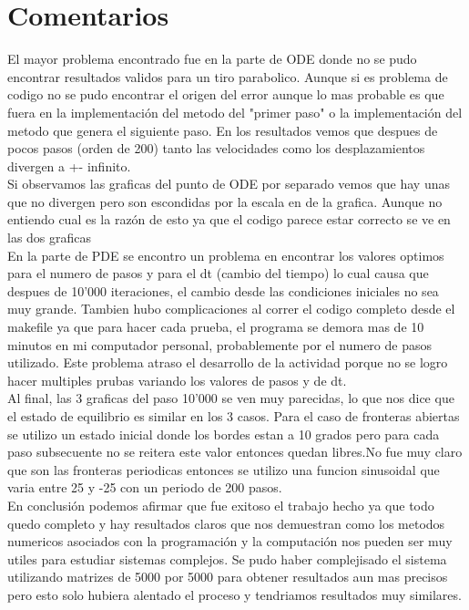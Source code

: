\documentclass[12pt]{article}
\begin{document}
\section{Comentarios}
El mayor problema encontrado fue en la parte de ODE donde no se pudo encontrar resultados validos para un tiro parabolico. Aunque si es problema de codigo no se pudo encontrar el origen del error aunque lo mas probable es que fuera en la implementaci\'on del metodo del "primer paso" o la implementaci\'on del metodo que genera el siguiente paso. En los resultados vemos que despues de pocos pasos (orden de 200) tanto las velocidades como los desplazamientos divergen a +- infinito. 
\\
Si observamos las graficas del punto de ODE por separado vemos que hay unas que no divergen pero son escondidas por la escala en de la grafica. Aunque no entiendo cual es la raz\'on de esto ya que el codigo parece estar correcto se ve en las dos graficas 
\\
En la parte de PDE se encontro un problema en encontrar los valores optimos para el numero de pasos y para el dt (cambio del tiempo) lo cual causa que despues de 10'000 iteraciones, el cambio desde las condiciones iniciales no sea muy grande. Tambien hubo complicaciones al correr el codigo completo desde el makefile ya que para hacer cada prueba, el programa se demora mas de 10 minutos en mi computador personal, probablemente por el numero de pasos utilizado. Este problema atraso el desarrollo de la actividad porque no se logro hacer multiples prubas variando los valores de pasos y de dt.
\\
Al final, las 3 graficas del paso 10'000 se ven muy parecidas, lo que nos dice que el estado de equilibrio es similar en los 3 casos. Para el caso de fronteras abiertas se utilizo un estado inicial donde los bordes estan a 10 grados pero para cada paso subsecuente no se reitera este valor entonces quedan libres.No fue muy claro que son las fronteras periodicas entonces se utilizo una funcion sinusoidal que varia entre 25 y -25 con un periodo de 200 pasos.
\\
En conclusi\'on podemos afirmar que fue exitoso el trabajo hecho ya que todo quedo completo y hay resultados claros que nos demuestran como los metodos numericos asociados con la programaci\'on y la computaci\'on nos pueden ser muy utiles para estudiar sistemas complejos. Se pudo haber complejisado el sistema utilizando matrizes de 5000 por 5000 para obtener resultados aun mas precisos pero esto solo hubiera alentado el proceso y tendriamos resultados muy similares.
\end{document}
